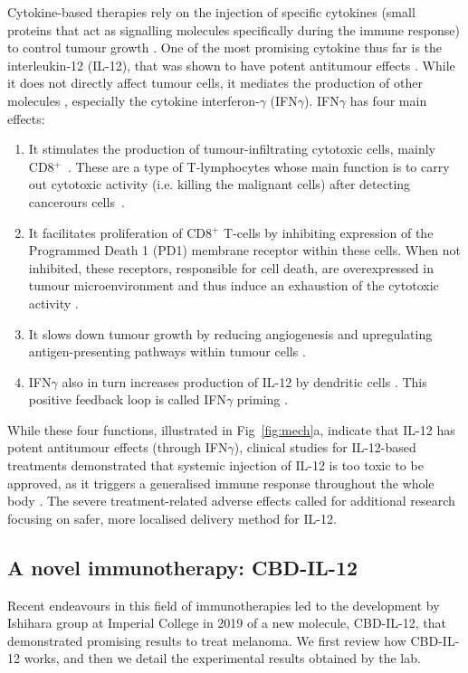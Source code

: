 \documentclass[11pt]{article}
\begin{document}
Cytokine-based therapies rely on the injection of specific cytokines (small proteins that act as signalling molecules specifically during the immune response) to control tumour growth \cite{ioDef}. One of the most promising cytokine thus far is the interleukin-12 (IL-12), that was shown to have potent antitumour effects \cite{il12IsCool}. While it does not directly affect tumour cells, it mediates the production of other molecules \cite{il12CytokineStorm}, especially the cytokine interferon-$\gamma$ (IFN$\gamma$). IFN$\gamma$ has four main effects:
\begin{enumerate}
    \item It stimulates the production of tumour-infiltrating cytotoxic cells, mainly CD8$^+$~\cite{ifngNKProd}\cite{ifnCD8}. These are a type of T-lymphocytes whose main function is to carry out cytotoxic activity (i.e. killing the malignant cells) after detecting cancerours cells~\cite{cd8Effects}.     
    \item It facilitates proliferation of CD8$^+$ T-cells by inhibiting expression of the Programmed Death 1 (PD1) membrane receptor within these cells. When not inhibited, these receptors, responsible for cell death, are overexpressed in tumour microenvironment and thus induce an exhaustion of the cytotoxic activity \cite{exhaustionPD1}.  
    \item It slows down tumour growth by reducing angiogenesis \cite{ifngAngiogenesis} and upregulating antigen-presenting pathways within tumour cells \cite{ifngAntigenExposure}.
    \item IFN$\gamma$ also in turn increases production of IL-12 by dendritic cells \cite{wang}. This positive feedback loop is called IFN$\gamma$ priming \cite{liuifng}\cite{ma2015}.
\end{enumerate}
While these four functions, illustrated in Fig~\ref{fig:mech}a, indicate that IL-12 has potent antitumour effects (through IFN$\gamma$), clinical studies for IL-12-based treatments demonstrated that systemic injection of IL-12 is too toxic to be approved, as it triggers a generalised immune response throughout the whole body \cite{clintriAC1}\cite{clintriAC3}. The severe treatment-related adverse effects called for additional research focusing on safer, more localised delivery method for IL-12.

\subsection{A novel immunotherapy: CBD-IL-12}\label{ssec:cbd}
Recent endeavours in this field of immunotherapies led to the development by Ishihara group at Imperial College in 2019 \cite{cbdil12} of a new molecule, CBD-IL-12, that demonstrated promising results to treat melanoma. We first review how CBD-IL-12 works, and then we detail the experimental results obtained by the lab. 
\end{document}
